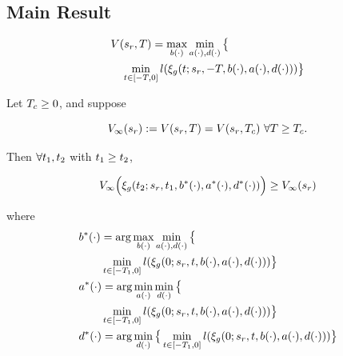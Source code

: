 \subsection{Main Result}


 \begin{equation}
 \begin{aligned}
& V(s_r, T) = \max_{b(\cdot)} \min_{a(\cdot), d(\cdot)} \big\{\\
&\quad \min_{t \in [-T, 0]} l(\xi_g(t; s_r, -T, b(\cdot), a(\cdot), d(\cdot)))\big\} 
 \end{aligned}
  \end{equation}
 
 \begin{thm}
   \label{thm:main}
   Let $T_c \ge 0$, and suppose
   
   \begin{equation}
   \label{eq:conv_valfunc}
   V_\infty(s_r) := V(s_r, T) = V(s_r, T_c) ~ \forall T \ge T_c.
   \end{equation}
   
   Then $\forall t_1, t_2$ with $t_1 \ge t_2$,
   
   \begin{equation}
   \label{eq:invariant}
   V_\infty\Big(\xi_g(t_2; s_r, t_1, b^*(\cdot), a^*(\cdot), d^*(\cdot))\Big) \ge V_\infty(s_r)
   \end{equation}
   
   \noindent where
   \begin{equation}
   \begin{aligned}
   & b^*(\cdot) = \arg \max_{b(\cdot)} \min_{a(\cdot), d(\cdot)}\big\{ \\
   & \qquad \min_{t \in [-T_1, 0]} l(\xi_g(0; s_r, t, b(\cdot), a(\cdot), d(\cdot))) \big\}\\
   & a^*(\cdot) = \arg \min_{a(\cdot)} \min_{d(\cdot)} \big\{ \\
   & \qquad \min_{t \in [-T_1, 0]} l(\xi_g(0; s_r, t, b(\cdot), a(\cdot), d(\cdot))) \big\} \\
   & d^*(\cdot) = \arg \min_{d(\cdot)} \big\{\min_{t \in [-T_1, 0]} l(\xi_g(0; s_r, t, b(\cdot), a(\cdot),  d(\cdot))) \big\}
   \end{aligned}
   \end{equation}
   
 \end{thm}
 
